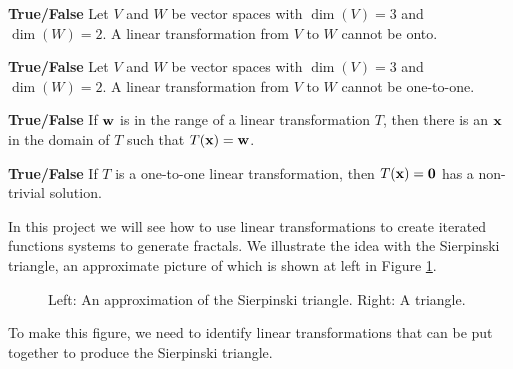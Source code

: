 \item \textbf{True/False} Let $V$ and $W$ be vector spaces with $\dim(V) = 3$ and $\dim(W) = 2$. A linear transformation from $V$ to $W$ cannot be onto.

\item \textbf{True/False} Let $V$ and $W$ be vector spaces with $\dim(V) = 3$ and $\dim(W) = 2$. A linear transformation from $V$ to $W$ cannot be one-to-one.

\item \textbf{True/False} If $\mathbf{w}$ is in the range of a linear transformation $T$, then there is an $\mathbf{x}$ in the domain of $T$ such that $T(\mathbf{x})=\mathbf{w}$.

\item \textbf{True/False} If $T$ is a one-to-one linear transformation, then $T(\mathbf{x})=\mathbf{0}$ has a non-trivial solution.

	\ea
	
\ee

\label{sec:proj_fractals}

In this project we will see how to use linear transformations to create iterated functions systems to generate fractals. We illustrate the idea with the Sierpinski triangle, an approximate picture of which is shown at left in Figure \ref{F:Striangle}.
\begin{figure}[h]
\begin{center}
\begin{minipage}{2.0in} \end{minipage} \hspace{0.3in} \vspace{-0.1in} \begin{minipage}{2.0in}   \end{minipage}
\caption{Left: An approximation of the Sierpinski triangle. Right: A triangle.}
\label{F:Striangle}
\end{center}
\end{figure}
To make this figure, we need to identify linear transformations that can be put together to produce the Sierpinski triangle.

